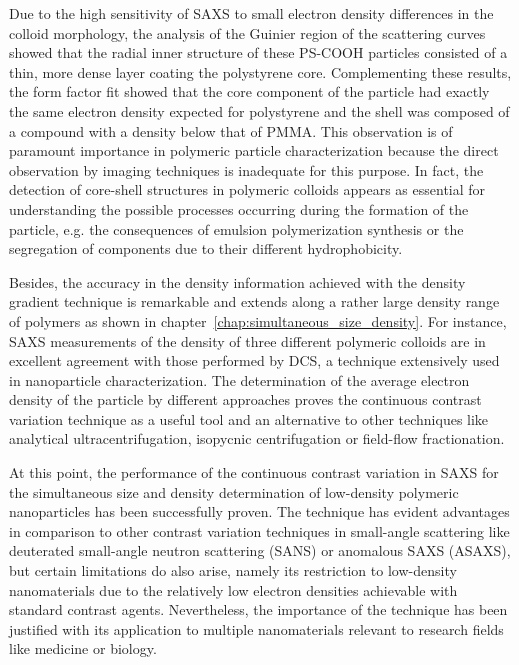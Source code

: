 Due to the high sensitivity of SAXS to small electron density differences in the colloid morphology, the analysis of the Guinier region of the scattering curves showed that the radial inner structure of these PS-COOH particles consisted of a thin, more dense layer coating the polystyrene core. Complementing these results, the form factor fit showed that the core component of the particle had exactly the same electron  density expected for polystyrene and the shell was composed of a compound with a density below that of PMMA. This observation is of paramount importance in polymeric particle characterization because the direct observation by imaging techniques is inadequate for this purpose. In fact, the detection of core-shell structures in polymeric colloids appears as essential for understanding the possible processes occurring during the formation of the particle, e.g. the consequences of emulsion polymerization synthesis or the segregation of components due to their different hydrophobicity.

Besides, the accuracy in the density information achieved with the density gradient technique is remarkable and extends along a rather large density range of polymers as shown in chapter~\ref{chap:simultaneous_size_density}. For instance, SAXS measurements of the density of three different polymeric colloids are in excellent agreement with those performed by DCS, a technique extensively used in nanoparticle characterization. The determination of the average electron density of the particle by different approaches proves the continuous contrast variation technique as a useful tool and an alternative to other techniques like analytical ultracentrifugation, isopycnic centrifugation or field-flow fractionation.

At this point, the performance of the continuous contrast variation in SAXS for the simultaneous size and density determination of low-density polymeric nanoparticles has been successfully proven. The technique has evident advantages in comparison to other contrast variation techniques in small-angle scattering like deuterated small-angle neutron scattering (SANS) or anomalous SAXS (ASAXS), but certain limitations do also arise, namely its restriction to low-density nanomaterials due to the relatively low electron densities achievable with standard contrast agents. Nevertheless, the importance of the technique has been justified with its application to multiple nanomaterials relevant to research fields like medicine or biology.

